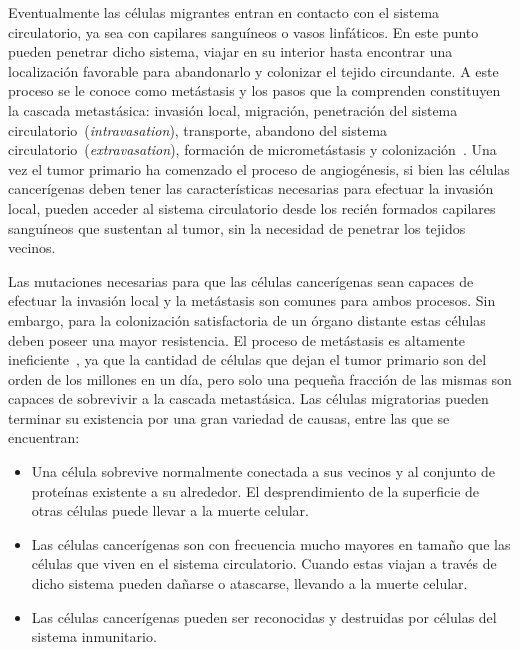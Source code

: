 Eventualmente las c\'elulas migrantes entran en contacto con el sistema circulatorio, ya sea con capilares sangu\'ineos o vasos linf\'aticos. En este punto pueden penetrar dicho sistema, viajar en su interior hasta encontrar una localizaci\'on favorable para abandonarlo y colonizar el tejido circundante. A este proceso se le conoce como met\'astasis y los pasos que la comprenden constituyen la cascada metast\'asica: invasi\'on local, migraci\'on, penetraci\'on del sistema circulatorio~(\textit{intravasation}), transporte, abandono del sistema circulatorio~(\textit{extravasation}), formaci\'on de micromet\'astasis y colonizaci\'on~\cite{robins,invasion,hanahan,cancerbook}. Una vez el tumor primario ha comenzado el proceso de angiog\'enesis, si bien las c\'elulas cancer\'igenas deben tener las caracter\'isticas necesarias para efectuar la invasi\'on local, pueden acceder al sistema circulatorio desde los reci\'en formados capilares sangu\'ineos que sustentan al tumor, sin la necesidad de penetrar los tejidos vecinos.

Las mutaciones necesarias para que las c\'elulas cancer\'igenas sean capaces de efectuar la invasi\'on local y la met\'astasis son comunes para ambos procesos. Sin embargo, para la colonizaci\'on satisfactoria de un \'organo distante estas c\'elulas deben poseer una mayor resistencia. El proceso de met\'astasis es altamente ineficiente~\cite{pubmed}, ya que la cantidad de c\'elulas que dejan el tumor primario son del orden de los millones en un d\'ia, pero solo una peque\~na fracci\'on de las mismas son capaces de sobrevivir a la cascada metast\'asica. Las c\'elulas migratorias pueden terminar su existencia por una gran variedad de causas, entre las que se encuentran:

\begin{itemize}
\item Una c\'elula sobrevive normalmente conectada a sus vecinos y al conjunto de prote\'inas existente a su alrededor. El desprendimiento de la superficie de otras c\'elulas puede llevar a la muerte celular.
\item Las c\'elulas cancer\'igenas son con frecuencia mucho mayores en tama\~no que las c\'elulas que viven en el sistema circulatorio. Cuando estas viajan a trav\'es de dicho sistema pueden da\~narse o atascarse, llevando a la muerte celular.
\item Las c\'elulas cancer\'igenas pueden ser reconocidas y destruidas por c\'elulas del sistema inmunitario.
\end{itemize}

